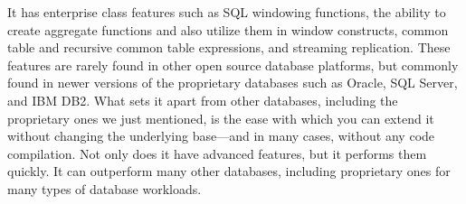 It has enterprise class features such as SQL windowing functions, the ability to create aggregate functions and also utilize them in window constructs, common table and
recursive common table expressions, and streaming replication. These features are rarely found in other open source database platforms, but commonly found in newer versions of the proprietary databases such as Oracle, SQL Server, and IBM DB2. What sets it apart from other databases, including the proprietary ones we just mentioned,
is the ease with which you can extend it without changing the underlying base—and in many cases, without any code compilation. Not only does it have advanced features,
but it performs them quickly. It can outperform many other databases, including proprietary ones for many types of database workloads.




